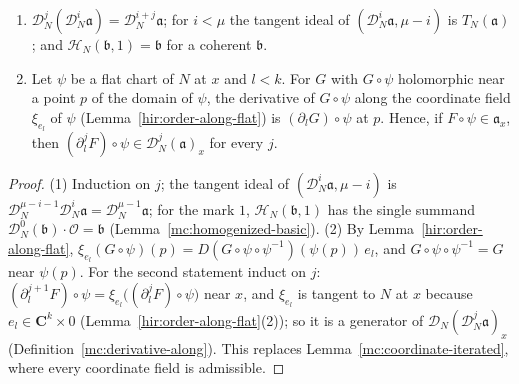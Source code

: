 \begin{lemma}
\label{mc:flat-coordinate-iterated}
\leanok
\begin{enumerate}
\item \(\mathcal D_N^j(\mathcal D_N^i\mathfrak a)=\mathcal D_N^{i+j}\mathfrak a\); for \(i<\mu\) the tangent ideal of \((\mathcal D_N^i\mathfrak a,\mu-i)\) is \(T_N(\mathfrak a)\); and
\(\mathcal H_N(\mathfrak b,1)=\mathfrak b\) for a coherent \(\mathfrak b\).
\item Let \(\psi\) be a flat chart of \(N\) at \(x\) and \(l<k\). For \(G\) with \(G\circ\psi\) holomorphic near a point \(p\) of the domain of \(\psi\), the derivative of
\(G\circ\psi\) along the coordinate field \(\xi_{e_l}\) of \(\psi\) (Lemma~\ref{hir:order-along-flat}) is \((\partial_lG)\circ\psi\) at \(p\). Hence, if \(F\circ\psi\in\mathfrak a_x\),
then \((\partial_l^jF)\circ\psi\in\mathcal D_N^j(\mathfrak a)_x\) for every \(j\).
\end{enumerate}
\end{lemma}
\begin{proof}
\leanok
(1) Induction on \(j\); the tangent ideal of \((\mathcal D_N^i\mathfrak a,\mu-i)\) is \(\mathcal D_N^{\mu-i-1}\mathcal D_N^i\mathfrak a=\mathcal D_N^{\mu-1}\mathfrak a\); for the mark \(1\),
\(\mathcal H_N(\mathfrak b,1)\) has the single summand \(\mathcal D_N^0(\mathfrak b)\cdot\mathcal O=\mathfrak b\) (Lemma~\ref{mc:homogenized-basic}).
(2) By Lemma~\ref{hir:order-along-flat}, \(\xi_{e_l}(G\circ\psi)(p)=D(G\circ\psi\circ\psi^{-1})(\psi(p))\,e_l\), and \(G\circ\psi\circ\psi^{-1}=G\) near \(\psi(p)\). For the second
statement induct on \(j\): \((\partial_l^{j+1}F)\circ\psi=\xi_{e_l}\bigl((\partial_l^jF)\circ\psi\bigr)\) near \(x\), and \(\xi_{e_l}\) is tangent to \(N\) at \(x\) because \(e_l\in\mathbf C^k\times0\)
(Lemma~\ref{hir:order-along-flat}(2)); so it is a generator of \(\mathcal D_N(\mathcal D_N^j\mathfrak a)_x\) (Definition~\ref{mc:derivative-along}). This replaces
Lemma~\ref{mc:coordinate-iterated}, where every coordinate field is admissible.
\end{proof}

